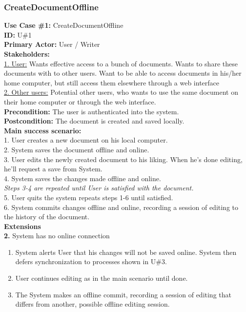 \subsubsection{CreateDocumentOffline}
\textbf{Use Case \#1:} CreateDocumentOffline\\
\textbf{ID:} U\#1\\
\textbf{Primary Actor:} User / Writer\\
\textbf{Stakeholders:}\\
\underline{1. User:} Wants effective access to a bunch of documents. Wants to share these documents with to other users. Want to be able to access documents in his/her home computer, but still access them elsewhere through a web interface\\
\underline{2. Other users:} Potential other users, who wants to use the same document on their home computer or through the web interface.\\
\newline
\textbf{Precondition:} The user is authenticated into the system.\\
\textbf{Postcondition:} The document is created and saved locally.\\
\newline
\textbf{Main success scenario:} \\
1. User creates a new document on his local computer.\\
2. System saves the document offline and online. \\
3. User edits the newly created document to his liking. When he's done editing, he'll request a save from System.\\
4. System saves the changes made offline and online.\\
\indent\textit{Steps 3-4 are repeated until User is satisfied with the document.}\\
5. User quits the system repeats steps 1-6 until satisfied.\\
6. System commits changes offline and online, recording a session of editing to the history of the document.\\
\newline
\textbf{Extensions}\\
\textbf{2.} System has no online connection
\begin{enumerate}
\item System alerts User that his changes will not be saved online. System then defers synchronization to processes shown in U\#3.
\item User continues editing as in the main scenario until done.
\item The System makes an offline commit, recording a session of editing that differs from another, possible offline editing session.
\end{enumerate}
